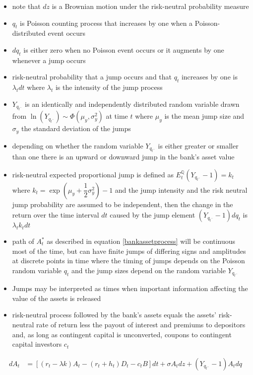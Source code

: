 \begin{itemize}
\item note that $dz$ is a Brownian motion under the risk-neutral probability measure
\item $q_t$ is Poisson counting process that increases by one when a Poisson-distributed event occurs
\item $dq_t$ is either zero when no Poisson event occurs or it augments by one whenever a jump occurs
\item risk-neutral probability that a jump occurs and that $q_t$ increases by one is $\lambda_t dt$ where $\lambda_t$ is the intensity of the jump process
\item $Y_{q_{t^{-}}}$ is an identically and independently distributed random variable drawn from $\ln(Y_{q_{t^{-}}}) \sim \Phi\left(\mu_{y}, \sigma^2_{y}\right)$ at time $t$ where $\mu_{y}$ is the mean jump size and $\sigma_{y}$ the standard deviation of the jumps
\item depending on whether the random variable $Y_{q_{t^{-}}}$ is either greater or smaller than one there is an upward or downward jump in the bank's asset value
\item risk-neutral expected proportional jump is defined as $E^{\mathbb{Q}}_t\left(Y_{q_{t^{-}}} - 1\right) = k_t$ where $k_t = \exp(\mu_{y}+\dfrac{1}{2}\sigma_y^2) - 1$ and the jump intensity and the risk neutral jump probability are assumed to be independent, then the change in the return over the time interval $dt$ caused by the jump element $(Y_{q_{t^{-}}}-1)dq_t$ is $\lambda_t k_t dt$
\item path of $A_t^*$ as described in equation \ref{bankassetprocess} will be continuous most of the time, but can have finite jumps of differing signs and amplitudes at discrete points in time where the timing of jumps depends on the Poisson random variable $q_t$ and the jump sizes depend on the random variable $Y_{q_{t^{-}}}$
\item Jumps may be interpreted as times when important information affecting the value of the assets is released \citep{duffie2001term}
\end{itemize}

\begin{itemize}
\item risk-neutral process followed by the bank's assets equals the assets' risk-neutral rate of return less the payout of interest and premiums to depositors and, as long as contingent capital is unconverted, coupons to contingent capital investors $c_t$
\end{itemize}
\begin{align} \label{bankassetprocess2}
dA_t &= \left[ \left( r_t - \lambda k \right) A_t - \left( r_t + h_t \right) D_t - c_t B \right] dt + \sigma A_t dz + \left( Y_{q_{t^{-}}} - 1 \right) A_t dq
\end{align}

